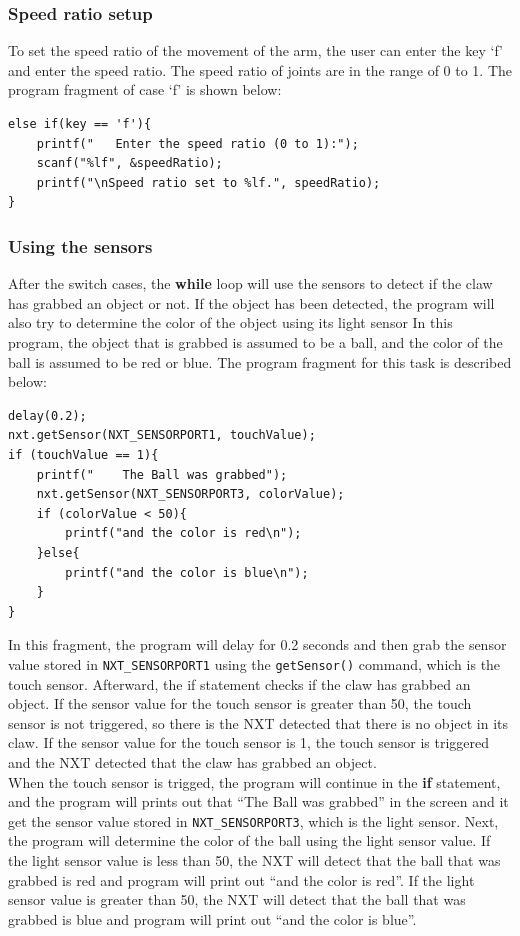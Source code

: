 \documentclass[11pt]{article}
\begin{document}
\subsubsection*{Speed ratio setup}
To set the speed ratio of the movement of the arm, the user can enter the key 
`f' and enter the speed ratio. The speed ratio of joints are in the range of 0 
to 1. The program fragment of case `f' is shown below:
\begin{lstlisting}
else if(key == 'f'){
    printf("   Enter the speed ratio (0 to 1):");
    scanf("%lf", &speedRatio);
    printf("\nSpeed ratio set to %lf.", speedRatio);
}
\end{lstlisting}

\subsubsection*{Using the sensors}
After the switch cases, the {\bf while} loop will use the sensors to detect if 
the claw has grabbed an object or not. If the object has been detected, the 
program will also try to determine the color of the object using its light sensor 
In this program, the object that is grabbed is assumed to be a ball, and the 
color of the ball is assumed to be red or blue. The program fragment for this 
task is described below:
\begin{lstlisting}
delay(0.2);
nxt.getSensor(NXT_SENSORPORT1, touchValue);
if (touchValue == 1){
    printf("    The Ball was grabbed");
    nxt.getSensor(NXT_SENSORPORT3, colorValue);
    if (colorValue < 50){
        printf("and the color is red\n");
    }else{
        printf("and the color is blue\n");
    }
}
\end{lstlisting}
In this fragment, the program will delay for 0.2 seconds and then grab the sensor 
value stored in {\tt NXT\_SENSORPORT1} using the {\tt getSensor()} command, which 
is the touch sensor. Afterward, the if statement checks if the claw has grabbed an 
object. If the sensor value for the touch sensor is greater than 50, the touch 
sensor is not triggered, so there is the NXT detected that there is no object in 
its claw. If the sensor value for the touch sensor is 1, the touch sensor is 
triggered and the NXT detected that the claw has grabbed an object. \\

When the touch sensor is trigged, the program will continue in the {\bf if} statement, 
and the program will prints out that ``The Ball was grabbed'' in the screen and it get 
the sensor value stored in {\tt NXT\_SENSORPORT3}, which is the light sensor. Next, the 
program will determine the color of the ball using the light sensor value. If the light 
sensor value is less than 50, the NXT will detect that the ball that was grabbed is 
red and program will print out ``and the color is red''. If the light sensor value is 
greater than 50, the NXT will detect that the ball that was grabbed is blue and program 
will print out ``and the color is blue''. \\
\end{document}
